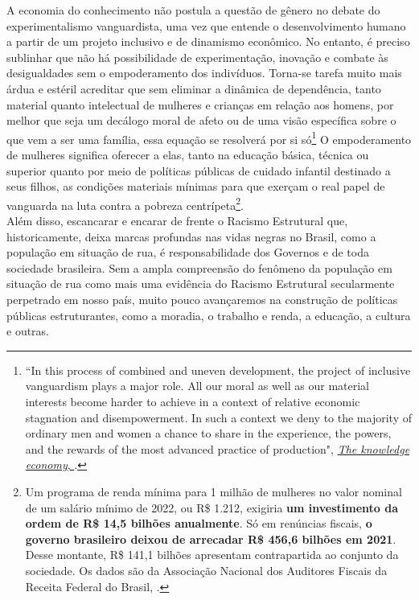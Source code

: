 \documentclass[14pt]{extarticle}
\begin{document}
A economia do conhecimento não postula a questão de gênero no debate do experimentalismo vanguardista, uma vez que entende o desenvolvimento humano a partir de um projeto inclusivo e de dinamismo econômico. No entanto, é preciso sublinhar que não há possibilidade de experimentação, inovação e combate às desigualdades sem o empoderamento dos indivíduos. Torna-se tarefa muito mais árdua e estéril acreditar que sem eliminar a dinâmica de dependência, tanto material quanto intelectual de mulheres e crianças em relação aos homens, por melhor que seja um decálogo moral de afeto ou de uma visão específica sobre o que vem a ser uma família, essa equação se resolverá por si só\footnote{``In this process of combined and uneven development, the project of inclusive vanguardism plays a major role. All our moral as well as our material interests become harder to achieve in a context of relative economic stagnation and disempowerment. In such a context we deny to the majority of ordinary men and women a chance to share in the experience, the powers, and the rewards of the most advanced practice of production", \href{https://www.oecd.org/naec/THE-KNOWLEDGE-ECONOMY.pdf}{\textit{The knowledge economy}, \citep[p. 80]{unger}}.} O empoderamento de mulheres significa oferecer a elas, tanto na educação básica, técnica ou superior quanto por meio de políticas públicas de cuidado infantil destinado a seus filhos, as condições materiais mínimas para que exerçam o real papel de vanguarda na luta contra a pobreza centrípeta\footnote{Um programa de renda mínima para 1 milhão de mulheres no valor nominal de um salário mínimo de 2022, ou R\$ 1.212, exigiria \textbf{um investimento da ordem de R\$ 14,5 bilhões anualmente}. Só em renúncias fiscais, \textbf{o governo brasileiro deixou de arrecadar R\$ 456,6 bilhões em 2021}. Desse montante, R\$ 141,1 bilhões apresentam contrapartida ao conjunto da sociedade. Os dados são da Associação Nacional dos Auditores Fiscais da Receita Federal do Brasil, \href{https://unafisconacional.org.br/nota-tecnica-unafisco-no-21-2021/}{\citep[p. 17-18]{unafisco}}.}.\\ 

Além disso, escancarar e encarar de frente o Racismo Estrutural que, historicamente, deixa marcas profundas nas vidas negras no Brasil, como a população em situação de rua, é responsabilidade dos Governos e de toda sociedade brasileira. Sem a ampla compreensão do fenômeno da população em situação de rua como mais uma evidência do Racismo Estrutural secularmente perpetrado em nosso país, muito pouco avançaremos na construção de políticas públicas estruturantes, como a moradia, o trabalho e renda, a educação, a cultura e outras.\\
\end{document}
